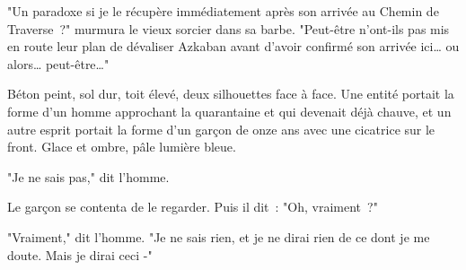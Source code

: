 "Un paradoxe si je le récupère immédiatement après son arrivée au Chemin de Traverse~?" murmura le vieux sorcier dans sa barbe. "Peut-être n'ont-ils pas mis en route leur plan de dévaliser Azkaban avant d'avoir confirmé son arrivée ici… ou alors… peut-être…"

\later

Béton peint, sol dur, toit élevé, deux silhouettes face à face. Une entité portait la forme d'un homme approchant la quarantaine et qui devenait déjà chauve, et un autre esprit portait la forme d'un garçon de onze ans avec une cicatrice sur le front. Glace et ombre, pâle lumière bleue.

"Je ne sais pas," dit l'homme.

Le garçon se contenta de le regarder. Puis il dit~: "Oh, vraiment~?"

"Vraiment," dit l'homme. "Je ne sais rien, et je ne dirai rien de ce dont je me doute. Mais je dirai ceci -" 

